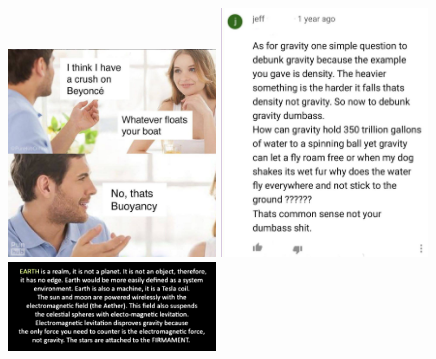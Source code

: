 
\includegraphics[width=5.5cm]{images/gravity_stupid/stupid1}
\includegraphics[width=5.5cm]{images/gravity_stupid/stupid2}
\includegraphics[width=5.5cm]{images/gravity_stupid/stupid3}

